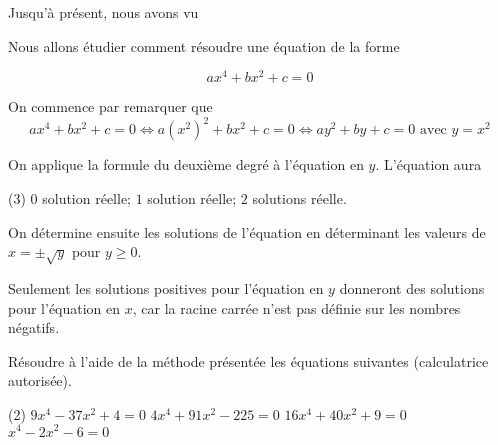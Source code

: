 \documentclass[a4paper,12pt]{report}
\begin{document}
Jusqu'à présent, nous avons vu 
\begin{boiteExT}
\vspace{5cm}
\end{boiteExT}
Nous allons étudier comment résoudre une équation de la forme

\[ax^4+bx^2+c=0\]

On commence par remarquer que 
\[ax^4+bx^2+c=0 \iff a(x^2)^2+bx^2+c=0 \iff ay^2+by+c=0 \text{ avec } y=x^2\]

On applique la formule du deuxième degré à l'équation en $y$. L'équation aura 
\begin{tasks}(3)
	\task[] $0$ solution réelle;
	\task[] $1$ solution réelle;
	\task[] $2$ solutions réelle.
\end{tasks}
On détermine ensuite les solutions de l'équation en déterminant les valeurs de $x=\pm\sqrt{y}$ pour $y\geq 0$.
\medskip

Seulement les solutions positives pour l'équation en $y$ donneront des solutions pour l'équation en $x$, car la racine carrée n'est pas définie sur les nombres négatifs.

\begin{boiteExT}[$x^4-20x^2+91=0$]
\vspace{10cm}
\end{boiteExT}
\newpage 
\begin{boiteExT}[$x^4+2x^2-1=0$]
\vspace{15cm}
\end{boiteExT}

\begin{exo}
	Résoudre à l'aide de la méthode présentée les équations suivantes (calculatrice autorisée). 
\begin{tasks}(2)
	\task $9 x^4-37 x^2+4=0$
	\task $4 x^4+91 x^2-225=0$
	\task $16 x^4+40 x^2+9=0$
	\task $x^4-2 x^2-6=0$
\end{tasks}
\end{exo}
\end{document}
